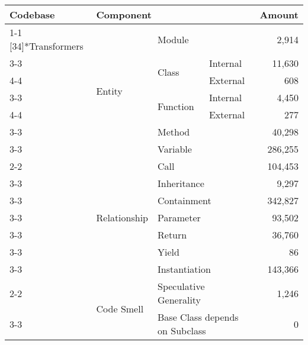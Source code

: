 \begin{tabularx}{\linewidth}{p{1.8cm}p{1.8cm}Xp{0.8cm}r}
\toprule
\textbf{Codebase} & \multicolumn{3}{l}{\textbf{Component}} & \textbf{Amount} \\
\cmidrule{1-1}\cmidrule{2-2}\cmidrule{3-3}\cmidrule{4-4}\cmidrule{5-5}
\multirow{17}[34]{*}{Transformers} & \multirow{7}[14]{*}{Entity} & \multicolumn{2}{l}{\textsf{Module}} & 2,914 \\
\cmidrule{3-3}\cmidrule{4-4}\cmidrule{5-5}
 &  & \multirow{2}[4]{*}{\textsf{Class}} & Internal & 11,630 \\
\cmidrule{4-4}\cmidrule{5-5}
 &  &  & External & 608 \\
\cmidrule{3-3}\cmidrule{4-4}\cmidrule{5-5}
 &  & \multirow{2}[4]{*}{\textsf{Function}} & Internal & 4,450 \\
\cmidrule{4-4}\cmidrule{5-5}
 &  &  & External & 277 \\
\cmidrule{3-3}\cmidrule{4-4}\cmidrule{5-5}
 &  & \multicolumn{2}{l}{\textsf{Method}} & 40,298 \\
\cmidrule{3-3}\cmidrule{4-4}\cmidrule{5-5}
 &  & \multicolumn{2}{l}{\textsf{Variable}} & 286,255 \\
\cmidrule{2-2}\cmidrule{3-3}\cmidrule{4-4}\cmidrule{5-5}
 & \multirow{7}[14]{*}{Relationship} & \multicolumn{2}{l}{Call} & 104,453 \\
\cmidrule{3-3}\cmidrule{4-4}\cmidrule{5-5}
 &  & \multicolumn{2}{l}{Inheritance} & 9,297 \\
\cmidrule{3-3}\cmidrule{4-4}\cmidrule{5-5}
 &  & \multicolumn{2}{l}{Containment} & 342,827 \\
\cmidrule{3-3}\cmidrule{4-4}\cmidrule{5-5}
 &  & \multicolumn{2}{l}{Parameter} & 93,502 \\
\cmidrule{3-3}\cmidrule{4-4}\cmidrule{5-5}
 &  & \multicolumn{2}{l}{Return} & 36,760 \\
\cmidrule{3-3}\cmidrule{4-4}\cmidrule{5-5}
 &  & \multicolumn{2}{l}{Yield} & 86 \\
\cmidrule{3-3}\cmidrule{4-4}\cmidrule{5-5}
 &  & \multicolumn{2}{l}{Instantiation} & 143,366 \\
\cmidrule{2-2}\cmidrule{3-3}\cmidrule{4-4}\cmidrule{5-5}
 & \multirow{3}[6]{*}{Code Smell} & \multicolumn{2}{l}{\begin{minipage}[t]{2.2cm}Speculative \newline Generality\end{minipage}} & 1,246 \\
\cmidrule{3-3}\cmidrule{4-4}\cmidrule{5-5}
 &  & \multicolumn{2}{l}{\begin{minipage}[t]{2.2cm}Base \textsf{Class} depends on Subclass\end{minipage}} & 0 \\

\end{tabularx}
